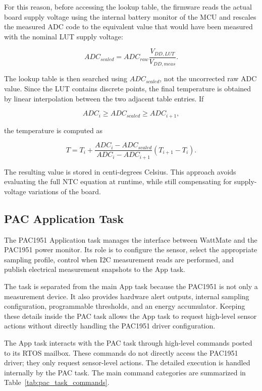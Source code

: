 For this reason, before accessing the lookup table, the firmware reads the actual board supply voltage using the internal battery monitor of the MCU and rescales the measured ADC code to the equivalent value that would have been measured with the nominal LUT supply voltage:

\[
ADC_{scaled} =
ADC_{raw}
\frac{V_{DD,LUT}}{V_{DD,meas}}.
\]

The lookup table is then searched using \(ADC_{scaled}\), not the uncorrected raw ADC value. Since the LUT contains discrete points, the final temperature is obtained by linear interpolation between the two adjacent table entries. If

\[
ADC_i \geq ADC_{scaled} \geq ADC_{i+1},
\]

the temperature is computed as

\[
T =
T_i +
\frac{ADC_i - ADC_{scaled}}{ADC_i - ADC_{i+1}}
\left(T_{i+1} - T_i\right).
\]

The resulting value is stored in centi-degrees Celsius. This approach avoids evaluating the full NTC equation at runtime, while still compensating for supply-voltage variations of the board.



\subsection{PAC Application Task}
\label{PAC_Application_Task}

The PAC1951 Application task manages the interface between WattMate and the PAC1951 power monitor. Its role is to configure the sensor, select the appropriate sampling profile, control when I2C measurement reads are performed, and publish electrical measurement snapshots to the App task.

The task is separated from the main App task because the PAC1951 is not only a measurement device. It also provides hardware alert outputs, internal sampling configuration, programmable thresholds, and an energy accumulator. Keeping these details inside the PAC task allows the App task to request high-level sensor actions without directly handling the PAC1951 driver configuration.

The App task interacts with the PAC task through high-level commands posted to its RTOS mailbox. These commands do not directly access the PAC1951 driver; they only request sensor-level actions. The detailed execution is handled internally by the PAC task. The main command categories are summarized in Table~\ref{tab:pac_task_commands}.

